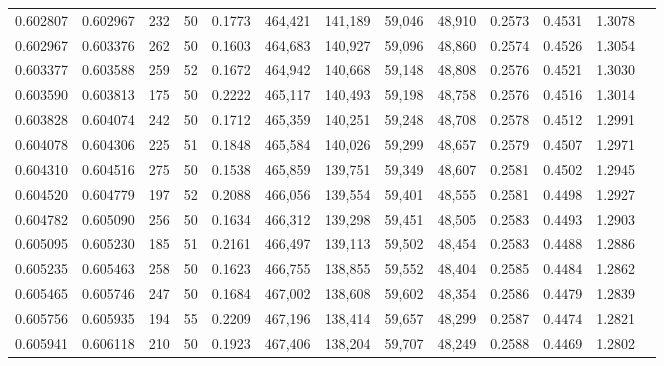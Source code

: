 \begin{tabular}{rrrrrrrrrrrrr}
0.602807 & 0.602967 &   232 &  50 &                                     0.1773 & 464,421 & 141,189 &  59,046 &  48,910 & 0.2573 & 0.4531 & 1.3078 \\
0.602967 & 0.603376 &   262 &  50 &                                     0.1603 & 464,683 & 140,927 &  59,096 &  48,860 & 0.2574 & 0.4526 & 1.3054 \\
0.603377 & 0.603588 &   259 &  52 &                                     0.1672 & 464,942 & 140,668 &  59,148 &  48,808 & 0.2576 & 0.4521 & 1.3030 \\
0.603590 & 0.603813 &   175 &  50 &                                     0.2222 & 465,117 & 140,493 &  59,198 &  48,758 & 0.2576 & 0.4516 & 1.3014 \\
0.603828 & 0.604074 &   242 &  50 &                                     0.1712 & 465,359 & 140,251 &  59,248 &  48,708 & 0.2578 & 0.4512 & 1.2991 \\
0.604078 & 0.604306 &   225 &  51 &                                     0.1848 & 465,584 & 140,026 &  59,299 &  48,657 & 0.2579 & 0.4507 & 1.2971 \\
0.604310 & 0.604516 &   275 &  50 &                                     0.1538 & 465,859 & 139,751 &  59,349 &  48,607 & 0.2581 & 0.4502 & 1.2945 \\
0.604520 & 0.604779 &   197 &  52 &                                     0.2088 & 466,056 & 139,554 &  59,401 &  48,555 & 0.2581 & 0.4498 & 1.2927 \\
0.604782 & 0.605090 &   256 &  50 &                                     0.1634 & 466,312 & 139,298 &  59,451 &  48,505 & 0.2583 & 0.4493 & 1.2903 \\
0.605095 & 0.605230 &   185 &  51 &                                     0.2161 & 466,497 & 139,113 &  59,502 &  48,454 & 0.2583 & 0.4488 & 1.2886 \\
0.605235 & 0.605463 &   258 &  50 &                                     0.1623 & 466,755 & 138,855 &  59,552 &  48,404 & 0.2585 & 0.4484 & 1.2862 \\
0.605465 & 0.605746 &   247 &  50 &                                     0.1684 & 467,002 & 138,608 &  59,602 &  48,354 & 0.2586 & 0.4479 & 1.2839 \\
0.605756 & 0.605935 &   194 &  55 &                                     0.2209 & 467,196 & 138,414 &  59,657 &  48,299 & 0.2587 & 0.4474 & 1.2821 \\
0.605941 & 0.606118 &   210 &  50 &                                     0.1923 & 467,406 & 138,204 &  59,707 &  48,249 & 0.2588 & 0.4469 & 1.2802 \\

\end{tabular}

